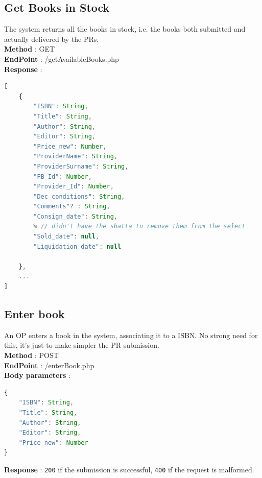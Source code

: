\subsection{Get Books in Stock}
The system returns all the books in stock, i.e. the books both submitted and actually delivered by the PRs.\\
\textbf{Method} : GET \\
\textbf{EndPoint} : /getAvailableBooks.php \\
\textbf{Response} :
\begin{lstlisting}[language=JavaScript, label={lst:jscode}, basicstyle=\ttfamily]
[
    {
        "ISBN": String,
        "Title": String,
        "Author": String,
        "Editor": String,
        "Price_new": Number,
        "ProviderName": String,
        "ProviderSurname": String,
        "PB_Id": Number,
        "Provider_Id": Number,
        "Dec_conditions": String,
        "Comments"? : String,
        "Consign_date": String,
        % // didn't have the sbatta to remove them from the select
        "Sold_date": null, 
        "Liquidation_date": null

    },
    ...
]
\end{lstlisting}

\subsection{Enter book}
An OP enters a book in the system, associating it to a ISBN. No strong need for this, it's just to make simpler the PR submission.\\
\textbf{Method} : POST \\
\textbf{EndPoint} : /enterBook.php \\
\textbf{Body parameters} :
\begin{lstlisting}[language=JavaScript, label={lst:jscode}, basicstyle=\ttfamily]
{
    "ISBN": String,
    "Title": String,
    "Author": String,
    "Editor": String,
    "Price_new": Number
}
\end{lstlisting}
\textbf{Response} : \texttt{200} if the submission is successful, \texttt{400} if the request is malformed.

